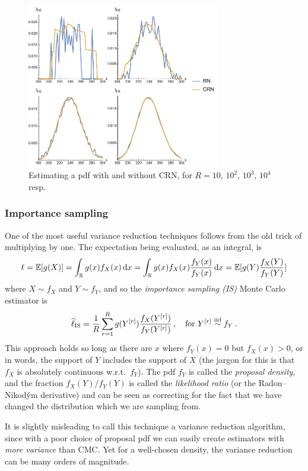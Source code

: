 \begin{figure}[H]
\centering
\includegraphics[width=0.75\textwidth]{images/crn.pdf}
\caption{Estimating a pdf with and without CRN, for $R = 10$, $10^2$, $10^3$, $10^4$ resp.}
\label{fig:crn}
\end{figure}

\subsubsection{Importance sampling}

One of the most useful variance reduction techniques follows from the old trick of multiplying by one. The expectation being evaluated, as an integral, is
\[ \ell = \operatorname{{\mathbb E}}[ g(X) ] = \int_{\mathbb{R}} g(x) f_X(x) \mathop{}\!\mathrm{d} x = \int_{\mathbb{R}} g(x) f_X(x) \frac{f_Y(x)}{f_Y(x)} \mathop{}\!\mathrm{d} x = \operatorname{{\mathbb E}}[ g(Y) \frac{f_X(Y)}{f_Y(Y)} ] \]
where $X \sim f_X$ and $Y \sim f_Y$, and so the \emph{importance sampling (IS)} Monte Carlo estimator is
\[ \widehat{\ell}_{\mathrm{IS}} = \frac1R \sum_{r=1}^R g(Y^{[r]}) \frac{f_X(Y^{[r]})}{f_Y(Y^{[r]})} \,, \quad \text{for } Y^{[r]} \overset{\smash{\mathrm{iid}}}{\sim} f_Y \,. \]
This approach holds so long as there are $x$ where $f_Y(x)=0$ but $f_X(x) > 0$, or in words, the support of $Y$ includes the support of $X$ (the jargon for this is that $f_X$ is absolutely continuous w.r.t.\ $f_Y$). The pdf $f_Y$ is called the \emph{proposal density}, and the fraction $f_X(Y) / f_Y(Y)$ is called the \emph{likelihood ratio} (or the Radon--Nikod{\'y}m derivative) and can be seen as correcting for the fact that we have changed the distribution which we are sampling from.

It is slightly misleading to call this technique a variance reduction algorithm, since with a poor choice of proposal pdf we can easily create estimators with \emph{more variance} than CMC. Yet for a well-chosen density, the variance reduction can be many orders of magnitude.

